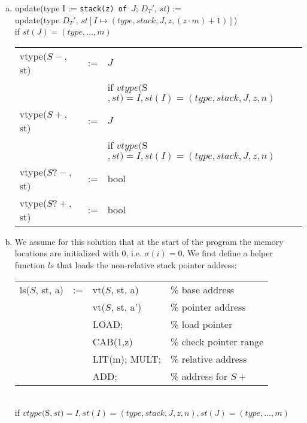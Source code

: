 \begin{solution}
  \begin{enumerate}[(a)]
    \item
    
    update(type I := \texttt{stack(z) of $J$}; $D_T'$, $st$) := \\
    \hspace*{5em} update(type $D_T'$, $st[I \mapsto (type,stack,J,z,(z\cdot m)+1)]$)\\
    if $st(J)=(type, \dots, m)$\\
    
    \begin{tabular}{lcl}
        vtype($S-$, st)  & := & $J$ \\
                         &    & if $vtype($S$,st)=I, st(I)=(type,stack,J,z,n)$\\
        vtype($S+$, st)  & := & $J$ \\
                         &    & if $vtype($S$,st)=I, st(I)=(type,stack,J,z,n)$\\
        vtype($S?-$, st) & := & bool \\
        vtype($S?+$, st) & := & bool \\
    \end{tabular}
    
    \item We assume for this solution that at the start of the program the memory locations are initialized with $0$, i.e. $\sigma(i)=0$.
    We first define a helper function $ls$ that loads the non-relative stack pointer address:\\
    \begin{tabular}{lcll}
        ls($S$, st, a) & := & vt($S$, st, a)  & \% base address \\
                       &    & vt($S$, st, a') & \% pointer address \\
                       &    & LOAD;           & \% load pointer \\
                       &    & CAB(1,z)        & \% check pointer range \\
                       &    & LIT(m); MULT;   & \% relative address \\
                       &    & ADD;            & \% address for $S+$ \\
    \end{tabular}\\
    if $vtype($S$,st) = I, st(I) = (type,stack,J,z,n), st(J) = (type, \dots, m)$
    

\end{enumerate}
\end{solution}
